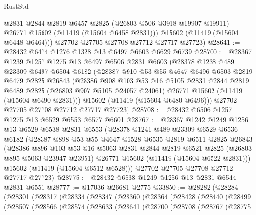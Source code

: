\begin{lexlean}{RustStd}
\begin{coremodule}
          @2831
          @2844
          @2819
          @6457
          @2825
          (@26803 @506 @3918 @19907 @19911)
          @26771
          @15602
          (@11419 (@15604 @6458 @2831)))
        @15602
        (@11419 (@15604 @6448 @6464)))
      @27702
      @27705
      @27708
      @27712
      @27717
      @27723)
@28641 := @28432 @6474 @1276 @1328 @13 @6497 @6603 @6629 @6739
@28700 := @28367
    @1239
    @1257
    @1275
    @13
    @6497
    @6506
    @2831
    @6603
    (@28378
      @1238
      @489
      @23309
      @6497
      @6504
      @6182
      (@28387
        @910
        @53
        @55
        @4647
        @6496
        @6503
        @2819
        @6479
        @2825
        @26843
        (@28386
          @908
          @103
          @53
          @16
          @5105
          @2831
          @2844
          @2819
          @6489
          @2825
          (@26803 @907 @5105 @24057 @24061)
          @26771
          @15602
          (@11419 (@15604 @6490 @2831)))
        @15602
        (@11419 (@15604 @6480 @6496)))
      @27702
      @27705
      @27708
      @27712
      @27717
      @27723)
@28708 := @28432 @6506 @1257 @1275 @13 @6529 @6553 @6577 @6601
@28767 := @28367
    @1242
    @1249
    @1256
    @13
    @6529
    @6538
    @2831
    @6553
    (@28378
      @1241
      @489
      @23309
      @6529
      @6536
      @6182
      (@28387
        @898
        @53
        @55
        @4647
        @6528
        @6535
        @2819
        @6511
        @2825
        @26843
        (@28386
          @896
          @103
          @53
          @16
          @5063
          @2831
          @2844
          @2819
          @6521
          @2825
          (@26803 @895 @5063 @23947 @23951)
          @26771
          @15602
          (@11419 (@15604 @6522 @2831)))
        @15602
        (@11419 (@15604 @6512 @6528)))
      @27702
      @27705
      @27708
      @27712
      @27717
      @27723)
@28775 := @28432 @6538 @1249 @1256 @13 @2831 @6544 @2831 @6551
@28777 := @17036 @26681 @2775
@33850 := @28282
    (@28284
      (@28301
        (@28317
          (@28334
            (@28347
              (@28360
                (@28364
                  (@28428
                    (@28440
                      (@28499
                        (@28507
                          (@28566
                            (@28574
                              (@28633
                                (@28641
                                  (@28700
                                    (@28708
                                      (@28767
                                        (@28775

\end{coremodule}
\end{lexlean}
